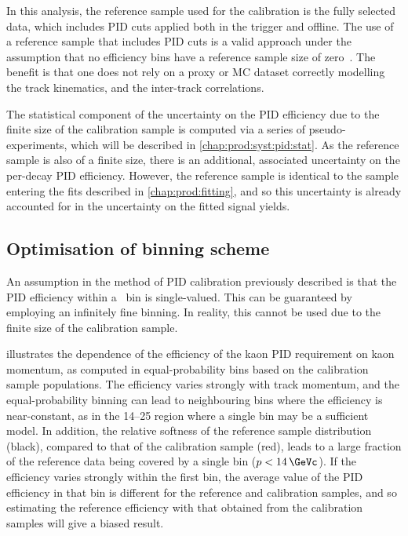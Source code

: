 In this analysis, the reference sample used for the calibration is the fully
selected data, which includes \ac{PID} cuts applied both in the trigger and
offline.
The use of a reference sample that includes \ac{PID} cuts is a valid approach
under the assumption that no efficiency bins have a reference sample size of
zero~\cite{Anderlini:2202412}.
The benefit is that one does not rely on a proxy or \ac{MC} dataset correctly
modelling the track kinematics, and the inter-track correlations.

The statistical component of the uncertainty on the \ac{PID} efficiency due to
the finite size of the calibration sample is computed via a series of
pseudo-experiments, which will be described in \cref{chap:prod:syst:pid:stat}.
As the reference sample is also of a finite size, there is an additional,
associated uncertainty on the per-decay \ac{PID} efficiency.
However, the reference sample is identical to the sample entering the fits
described in \cref{chap:prod:fitting}, and so this uncertainty is already
accounted for in the uncertainty on the fitted signal yields.

\subsection{Optimisation of \texorpdfstring{\ptotetanspd}{(p, eta, Nspd)} binning scheme}
\label{chap:prod:effs:pid:binning}

An assumption in the method of \ac{PID} calibration previously described is
that the \ac{PID} efficiency within a \ptotetanspd\ bin is single-valued.
This can be guaranteed by employing an infinitely fine binning.
In reality, this cannot be used due to the finite size of the calibration
sample.

 illustrates the
dependence of the efficiency of the kaon \ac{PID} requirement on kaon momentum,
as computed in equal-probability bins based on the calibration sample
populations.
The efficiency varies strongly with track momentum, and the equal-probability
binning can lead to neighbouring bins where the efficiency is near-constant, as
in the 14--\SI{25}{\GeVc} region where a single bin may be a sufficient model.
In addition, the relative softness of the reference sample distribution
(black), compared to that of the calibration sample (red), leads to a large
fraction of the reference data being covered by a single bin ($p <
\SI{14}{\GeVc}$).
If the efficiency varies strongly within the first bin, the average value of
the \ac{PID} efficiency in that bin is different for the reference and
calibration samples, and so estimating the reference efficiency with that
obtained from the calibration samples will give a biased result.


